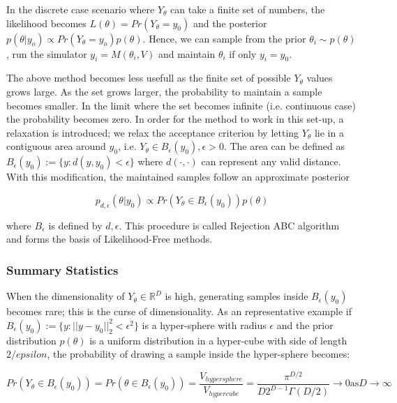 \documentclass[11pt,twoside]{article}
\numberwithin{Theorem}{section}
\numberwithin{Definition}{section}
\numberwithin{Lemma}{section}
\numberwithin{Algorithm}{section}
\numberwithin{equation}{section}
\begin{document}
In the discrete case scenario where $Y_\theta$ can take a finite set of numbers, the likelihood becomes $L(\theta) = Pr(Y_\theta=y_0)$ and the posterior $p(\theta|y_o) \propto Pr(Y_\theta=y_o)p(\theta)$. Hence, we can sample from the prior $\theta_i \sim p(\theta)$, run the simulator $y_i = M(\theta_i, V)$ and maintain $\theta_i$ if only $y_i = y_0$.

The above method becomes less usefull as the finite set of possible $Y_\theta$ values grows large. As the set grows larger, the probability to maintain a sample becomes smaller. In the limit where the set becomes infinite (i.e. continuous case) the probability becomes zero. In order for the method to work in this set-up, a relaxation is introduced; we relax the acceptance criterion by letting $Y_\theta$ lie in a contiguous area around $y_0$, i.e. $Y_\theta \in B_\epsilon(y_0), \epsilon > 0$. The area can be defined as $B_\epsilon(y_0) := \{y: d(y, y_0) < \epsilon \}$ where $d(\cdot, \cdot)$ can represent any valid distance. With this modification, the maintained samples follow an approximate posterior

\begin{equation}
  p_{d,\epsilon}(\theta|y_0) \propto Pr(Y_\theta \in B_\epsilon(y_0))p(\theta)
  \end{equation}

  where $B_\epsilon$ is defined by $d, \epsilon$. This procedure is called Rejection ABC algorithm and forms the basis of Likelihood-Free methods.

\subsubsection{Summary Statistics}

When the dimensionality of $Y_\theta \in \mathbb{R}^D$ is high, generating samples inside $B_\epsilon(y_0)$ becomes rare; this is the curse of dimensionality. As an representative example if $B_\epsilon(y_0) := \{ y: ||y - y_0||_2^2 < \epsilon^2 \}$ is a hyper-sphere with radius $\epsilon$ and the prior distribution $p(\theta)$ is a uniform distribution in a hyper-cube with side of length $2/epsilon$, the probability of drawing a sample inside the hyper-sphere becomes:

\begin{equation}
  Pr(Y_\theta \in B_\epsilon(y_0)) = Pr(\theta \in B_\epsilon(y_0)) = \frac{V_{hypersphere}}{V_{hypercube}} = \frac{\pi^{D/2}}{D2^{D-1}\Gamma(D/2)} \rightarrow 0 \text{as} D \rightarrow \infty
\end{equation}
\end{document}
